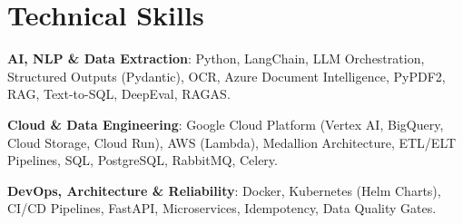 \section{Technical Skills}
\resumeSubHeadingListStart
\item\small{
  \textbf{AI, NLP \& Data Extraction}{: Python, LangChain, LLM Orchestration, Structured Outputs (Pydantic), OCR, Azure Document Intelligence, PyPDF2, RAG, Text-to-SQL, DeepEval, RAGAS.}
  \hfill
}
\item\small{
  \textbf{Cloud \& Data Engineering}{: Google Cloud Platform (Vertex AI, BigQuery, Cloud Storage, Cloud Run), AWS (Lambda), Medallion Architecture, ETL/ELT Pipelines, SQL, PostgreSQL, RabbitMQ, Celery.}
  \hfill
}
\item\small{
  \textbf{DevOps, Architecture \& Reliability}{: Docker, Kubernetes (Helm Charts), CI/CD Pipelines, FastAPI, Microservices, Idempotency, Data Quality Gates.}
  \hfill
}
\resumeSubHeadingListEnd
